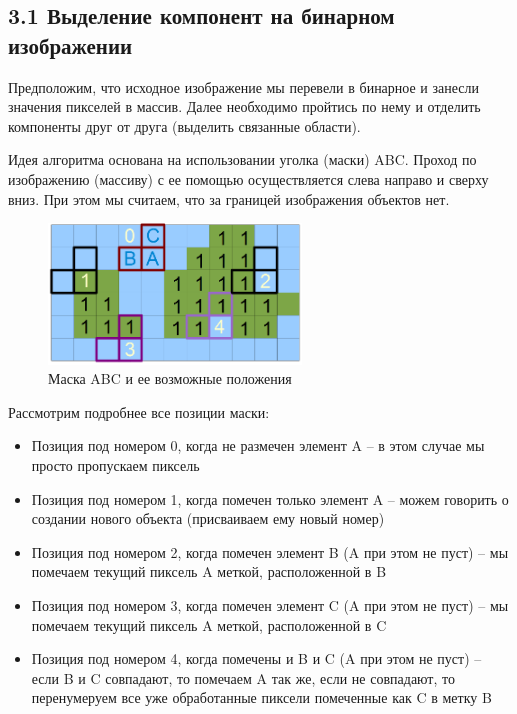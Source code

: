 \documentclass{report}
\begin{document}
\subsection*{3.1 Выделение компонент на бинарном изображении}
\par Предположим, что исходное изображение мы перевели в бинарное и занесли значения пикселей в массив. Далее необходимо пройтись по нему и отделить компоненты друг от друга (выделить связанные области). 
\par Идея алгоритма основана на использовании уголка (маски) ABC. Проход по изображению (массиву) с ее помощью осуществляется слева направо и сверху вниз. При этом мы считаем, что за границей изображения объектов нет.
\begin{figure}[htbp]
  \centering
  \includegraphics[width=0.6\textwidth]{3 ABC}
  \caption{Маска ABC и ее возможные положения}\label{fig:3 ABC}
\end{figure}
\par Рассмотрим подробнее все позиции маски:
\begin{itemize}
\item Позиция под номером 0, когда не размечен элемент A – в этом случае мы просто пропускаем пиксель
\item Позиция под номером 1, когда помечен только элемент A – можем говорить о создании нового объекта (присваиваем ему новый номер)
\item Позиция под номером 2, когда помечен элемент B (A при этом не пуст) – мы помечаем текущий пиксель A меткой, расположенной в B
\item Позиция под номером 3, когда помечен элемент C (A при этом не пуст) – мы помечаем текущий пиксель A меткой, расположенной в C
\item Позиция под номером 4, когда помечены и B и C (A при этом не пуст) – если B и C совпадают, то помечаем A так же, если не совпадают, то перенумеруем все уже обработанные пиксели помеченные как C в метку B
\end{itemize}
\end{document}
